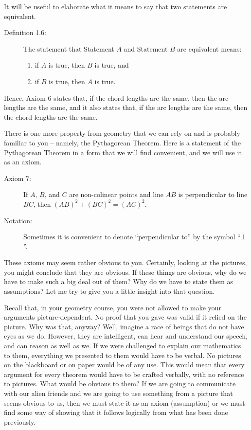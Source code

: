 \documentclass[english]{book}
\begin{document}
It will be useful to elaborate what it means to say that two statements are equivalent.

\begin{description}
\item[Definition 1.6:] The statement that Statement $A$ and Statement $B$ are equivalent means:
  \begin{enumerate}[\hspace{1cm}1)]
    \item if $A$ is true, then $B$ is true, and
    \item if $B$ is true, then $A$ is true.
  \end{enumerate}
\end{description}

Hence, Axiom 6 states that, if the chord lengths are the same, then the arc lengths are the same, and it also states that, if the arc lengths are the same, then the chord lengths are the same.

There is one more property from geometry that we can rely on and is probably familiar to you -- namely, the Pythagorean Theorem. Here is a statement of the Pythagorean Theorem in a form that we will find convenient, and we will use it as an axiom.

\begin{description}

\item[Axiom 7:] If $A$, $B$, and $C$ are non-colinear points and line $AB$ is perpendicular to line $BC$, then $(AB)^{2} + (BC)^{2} = (AC)^{2}$.

\item[Notation:] Sometimes it is convenient to denote ``perpendicular to'' by the symbol ``$\bot$''. 

\end{description}

These axioms may seem rather obvious to you. Certainly, looking at the pictures, you might conclude that they are obvious. If these things are obvious, why do we have to make such a big deal out of them? Why do we have to state them as assumptions? Let me try to give you a little insight into that question. 

Recall that, in your geometry course, you were not allowed to make your arguments picture-dependent. No proof that you gave was valid if it relied on the picture. Why was that, anyway? Well, imagine a race of beings that do not have eyes as we do. However, they are intelligent, can hear and understand our speech, and can reason as well as we. If we were challenged to explain our mathematics to them, everything we presented to them would have to be verbal. No pictures on the blackboard or on paper would be of any use. This would mean that every argument for every theorem would have to be crafted verbally, with no reference to pictures. What would be obvious to them? If we are going to communicate with our alien friends and we are going to use something from a picture that seems obvious to us, then we must state it as an axiom (assumption) or we must find some way of showing that it follows logically from what has been done previously.
\end{document}
